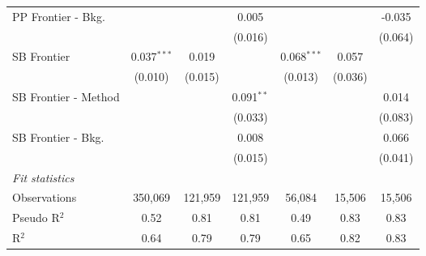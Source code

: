 \begin{tabular}{lcccccc}
   PP Frontier - Bkg.   &               &               & 0.005         &               &              & -0.035\\   
                        &               &               & (0.016)       &               &              & (0.064)\\   
   SB Frontier          & 0.037$^{***}$ & 0.019         &               & 0.068$^{***}$ & 0.057        &   \\   
                        & (0.010)       & (0.015)       &               & (0.013)       & (0.036)      &   \\   
   SB Frontier - Method &               &               & 0.091$^{**}$  &               &              & 0.014\\   
                        &               &               & (0.033)       &               &              & (0.083)\\   
   SB Frontier - Bkg.   &               &               & 0.008         &               &              & 0.066\\   
                        &               &               & (0.015)       &               &              & (0.041)\\   
   \midrule
   \emph{Fit statistics}\\
   Observations         & 350,069       & 121,959       & 121,959       & 56,084        & 15,506       & 15,506\\  
   Pseudo R$^2$         & 0.52          & 0.81          & 0.81          & 0.49          & 0.83         & 0.83\\  
   R$^2$                & 0.64          & 0.79          & 0.79          & 0.65          & 0.82         & 0.83\\  
   

\end{tabular}
